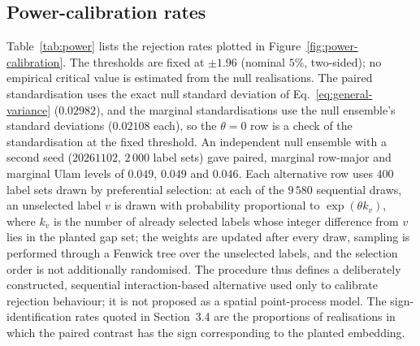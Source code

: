 \documentclass[final,1p,times,authoryear]{elsarticle}
\theoremstyle{definition}
\begin{document}
\subsection{Power-calibration rates}

Table~\ref{tab:power} lists the rejection rates plotted in
Figure~\ref{fig:power-calibration}. The thresholds are fixed at $\pm1.96$
(nominal $5\%$, two-sided); no empirical critical value is estimated from the
null realisations. The paired standardisation uses the exact null standard
deviation of Eq.~\eqref{eq:general-variance} ($0.02982$), and the marginal
standardisations use the null ensemble's standard deviations ($0.02108$
each), so the $\theta=0$ row is a check of the standardisation at the fixed
threshold. An independent null ensemble with a second seed ($20261102$,
$2\,000$ label sets) gave paired, marginal row-major and marginal Ulam levels
of $0.049$, $0.049$ and $0.046$. Each alternative row uses $400$ label sets
drawn by preferential selection: at each of the $9\,580$ sequential draws, an
unselected label $v$ is drawn with probability proportional to
$\exp(\theta k_v)$, where $k_v$ is the number of already selected labels
whose integer difference from $v$ lies in the planted gap set; the weights
are updated after every draw, sampling is performed through a Fenwick tree
over the unselected labels, and the selection order is not additionally
randomised. The procedure thus defines a deliberately constructed, sequential
interaction-based alternative used only to calibrate rejection behaviour; it
is not proposed as a spatial point-process model. The sign-identification
rates quoted in Section~3.4 are the
proportions of realisations in which the paired contrast has the sign
corresponding to the planted embedding.
\end{document}
